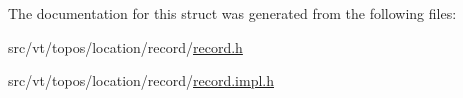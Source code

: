 The documentation for this struct was generated from the following files\+:\begin{DoxyCompactItemize}
\item 
src/vt/topos/location/record/\hyperlink{record_8h}{record.\+h}\item 
src/vt/topos/location/record/\hyperlink{record_8impl_8h}{record.\+impl.\+h}\end{DoxyCompactItemize}
